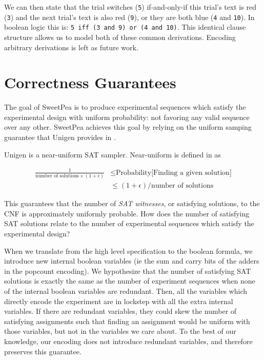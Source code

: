 We can then state that the trial switches (\texttt{5}) if-and-only-if this trial's text is red (\texttt{3}) and the next trial's text is also red (\texttt{9}), or they are both blue (\texttt{4} and \texttt{10}). In boolean logic this is: \texttt{5 iff (3 and 9) or (4 and 10)}. This identical clause structure allows us to model both of these common derivations. Encoding arbitrary derivations is left as future work.

\section{Correctness Guarantees}

The goal of SweetPea is to produce experimental sequences which satisfy the experimental design with uniform probability: not favoring any valid sequence over any other. SweetPea achieves this goal by relying on the uniform samping guarantee that Unigen provides in \cite{chakraborty2013scalable}.

Unigen is a near-uniform SAT sampler. Near-uniform is defined in \cite{meel2016constrained} as

\begin{align*}
  \frac{1}{\text{number of solutions}\times(1+ \epsilon)} & \leq \text{Probability[Finding a given solution]} \\
  &\leq (1+\epsilon) / \text{number of solutions}
\end{align*}

This guarantees that the number of \emph{SAT witnesses}, or satisfying solutions, to the CNF is approximately uniformly probable. How does the number of satisfying SAT solutions relate to the number of experimental sequences which satisfy the experimental design?

When we translate from the high level specification to the boolean formula, we introduce new internal boolean variables (ie the sum and carry bits of the adders in the popcount encoding). We hypothesize that the number of satisfying SAT solutions is exactly the same as the number of experiment sequences when none of the internal boolean variables are redundant. Then, all the variables which directly encode the experiment are in lockstep with all the extra internal variables. If there are redundant variables, they could skew the number of satisfying assignments such that finding an assignment would be uniform with those variables, but not in the variables we care about. To the best of our knowledge, our encoding does not introduce redundant variables, and therefore preserves this guarantee.

